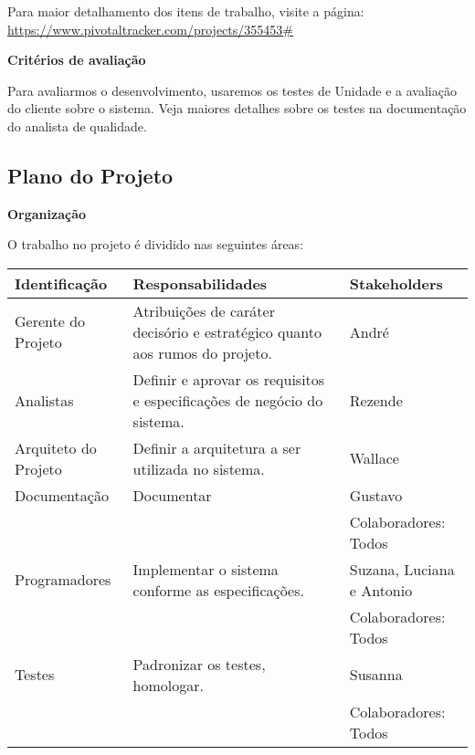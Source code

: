 \documentclass[12pt,letterpaper]{article}
\begin{document}
\bigskip

Para maior detalhamento dos itens de trabalho, visite a página: 
\url{https://www.pivotaltracker.com/projects/355453#}

\vspace{1cm}
{\large {\bf Critérios de avaliação}}
\vspace{0.5cm}

Para avaliarmos o desenvolvimento, usaremos os testes de Unidade e a avaliação do cliente sobre o sistema.
Veja maiores detalhes sobre os testes na documentação do analista de qualidade.

\pagebreak

\subsection{Plano do Projeto}

\vspace{1cm}
{\large {\bf Organização}}
\vspace{0.5cm}

O trabalho no projeto é dividido nas seguintes áreas:

\begin{table}[ht!]
\begin{small} %
    \begin{tabular}{| l | p{7cm} | p{5cm} |}
    \hline
    Identificação & Responsabilidades & Stakeholders\\
    \hline
    \hline
    Gerente do Projeto &
    Atribuições de caráter decisório e estratégico quanto aos rumos do projeto. &
    André\\
    \hline
    Analistas &
    Definir e aprovar os requisitos e especificações de negócio do sistema. &
    Rezende\\
    \hline
    Arquiteto do Projeto &
    Definir a arquitetura a ser utilizada no sistema. &
    Wallace\\
    \hline
    Documentação &
    Documentar &
    Gustavo\\
    & & Colaboradores: Todos\\
    \hline
    Programadores &
    Implementar o sistema conforme as especificações. &
    Suzana, Luciana e Antonio\\
    & & Colaboradores: Todos\\
    \hline
    Testes &
    Padronizar os testes, homologar. &
    Susanna\\
    & & Colaboradores: Todos\\
    \hline
    \end{tabular}
\end{small}
\end{table}
\end{document}
